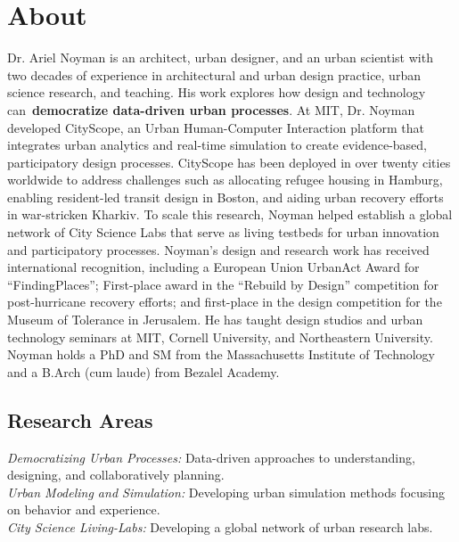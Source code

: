 \section*{About}

 {
  Dr. Ariel Noyman is an architect, urban designer, and an urban scientist with two decades of experience in architectural and urban design practice, urban science research, and teaching. His work explores how design and technology can~\textbf{democratize data-driven urban processes}. At MIT, Dr. Noyman developed CityScope, an Urban Human-Computer Interaction platform that integrates urban analytics and real-time simulation to create evidence-based, participatory design processes. CityScope has been deployed in over twenty cities worldwide to address challenges such as allocating refugee housing in Hamburg, enabling resident-led transit design in Boston, and aiding urban recovery efforts in war-stricken Kharkiv. To scale this research, Noyman helped establish a global network of City Science Labs that serve as living testbeds for urban innovation and participatory processes.
  Noyman's design and research work has received international recognition, including a European Union UrbanAct Award for ``FindingPlaces''; First-place award in the ``Rebuild by Design'' competition for post-hurricane recovery efforts; and first-place in the design competition for the Museum of Tolerance in Jerusalem. He has taught design studios and urban technology seminars at MIT, Cornell University, and Northeastern University. Noyman holds a PhD and SM from the Massachusetts Institute of Technology and a B.Arch (cum laude) from Bezalel Academy.
 }

\subsection*{Research Areas}
\textit{Democratizing Urban Processes:} Data-driven approaches to understanding, designing, and collaboratively planning.
\\
\textit{Urban Modeling and Simulation:} Developing urban simulation methods focusing on behavior and experience.
\\
\textit{City Science Living-Labs:} Developing a global network of urban research labs.